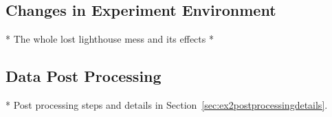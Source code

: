 \subsection{Changes in Experiment Environment}
   * The whole lost lighthouse mess and its effects
   * 
   
\subsection{Data Post Processing}
* Post processing steps and details in Section~\ref{sec:ex2postprocessingdetails}.